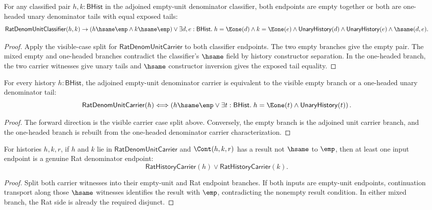 \begin{theorem}
\label{thm:rat-denom-unit-classifier-visible-cases}
For any classified pair $h,k:\mathsf{BHist}$ in the adjoined empty-unit
denominator classifier, both endpoints are empty together or both are
one-headed unary denominator tails with equal exposed tails:
$$
\mathsf{RatDenomUnitClassifier}(h,k)\to
\left(
h\hsame\emp\land k\hsame\emp
\right)
\lor
\exists d,e:\mathsf{BHist}.\;
h=\Eone(d)\land k=\Eone(e)\land
\mathsf{UnaryHistory}(d)\land\mathsf{UnaryHistory}(e)\land\hsame(d,e).
$$
\end{theorem}
\begin{proof}
Apply the visible-case split for $\mathsf{RatDenomUnitCarrier}$ to both
classifier endpoints. The two empty branches give the empty pair. The mixed
empty and one-headed branches contradict the classifier's $\hsame$ field by
history constructor separation. In the one-headed branch, the two carrier
witnesses give unary tails and $\hsame$ constructor inversion gives the
exposed tail equality.
\end{proof}

\begin{theorem}
\label{thm:rat-denom-unit-carrier-visible-cases-iff}
For every history $h:\mathsf{BHist}$, the adjoined empty-unit denominator
carrier is equivalent to the visible empty branch or a one-headed unary
denominator tail:
$$
\mathsf{RatDenomUnitCarrier}(h)
\Longleftrightarrow
\left(
h\hsame\emp
\lor
\exists t:\mathsf{BHist}.\; h=\Eone(t)\land\mathsf{UnaryHistory}(t)
\right).
$$
\end{theorem}
\begin{proof}
The forward direction is the visible carrier case split above. Conversely, the
empty branch is the adjoined unit carrier branch, and the one-headed branch is
rebuilt from the one-headed denominator carrier characterization.
\end{proof}

\begin{theorem}
\label{thm:rat-denom-unit-continuation-nonempty-rat-endpoint}
For histories $h,k,r$, if $h$ and $k$ lie in
$\mathsf{RatDenomUnitCarrier}$ and $\Cont(h,k,r)$ has a result not
$\hsame$ to $\emp$, then at least one input endpoint is a genuine Rat
denominator endpoint:
$$
\mathsf{RatHistoryCarrier}(h)\lor\mathsf{RatHistoryCarrier}(k).
$$
\end{theorem}
\begin{proof}
Split both carrier witnesses into their empty-unit and Rat endpoint branches.
If both inputs are empty-unit endpoints, continuation transport along those
$\hsame$ witnesses identifies the result with $\emp$, contradicting the
nonempty result condition. In either mixed branch, the Rat side is already the
required disjunct.
\end{proof}

